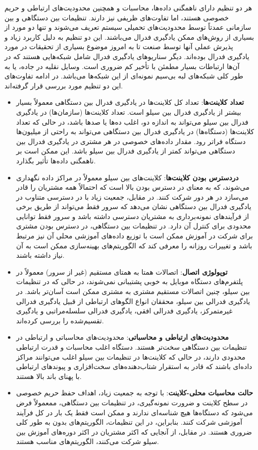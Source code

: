 هر دو تنظیم دارای ناهمگنی داده‌ها، محاسبات و همچنین محدودیت‌های ارتباطی و حریم خصوصی هستند، اما تفاوت‌های ظریفی نیز دارند. تنظیمات بین دستگاهی و بین سازمانی عمدتاً توسط محدودیت‌های تحمیلی سیستم تعریف می‌شوند و تنها دو مورد از بسیاری از روش‌های ممکن یادگیری فدرال می‌باشند. این دو تنظیم به دلیل کاربرد زیاد و پذیرش عملی آنها توسط صنعت تا به امروز موضوع بسیاری از تحقیقات در مورد یادگیری فدرال بوده‌اند. دیگر سناریوهای یادگیری فدرال شامل شبکه‌هایی هستند که در آن‌ها ارتباطات بسیار مطمئن با تأخیر کم ضروری است. وسایل نقلیه در جاده، یا به طور کلی شبکه‌های لبه بی‌سیم نمونه‌ای از این شبکه‌ها می‌باشد. در ادامه تفاوت‌های این دو تنظیم مورد بررسی قرار گرفته‌اند.
\begin{itemize}
	\item 
	\textbf{تعداد کلاینت‌ها}: تعداد کل کلاینت‌ها در یادگیری فدرال بین دستگاهی معمولاً بسیار بیشتر از یادگیری فدرال بین سیلو است. تعداد کلاینت‌ها (سازمان‌ها) در یادگیری فدرال بین سیلو می‌تواند به اندازه دو، اغلب ده‌ها یا صدها باشد، در حالی که تعداد کلاینت‌ها‌ (دستگاه‌ها) در یادگیری فدرال بین دستگاهی می‌تواند به راحتی از میلیون‌ها دستگاه فراتر رود. مقدار داده‌های خصوصی در هر مشتری در یادگیری فدرال بین دستگاهی می‌تواند کمتر از یادگیری فدرال بین سیلو باشد. این ممکن است بر ناهمگنی داده‌ها تأثیر بگذارد.
	\item 
	\textbf{دردسترس بودن کلاینت‌ها}: کلاینت‌های بین سیلو معمولاً در مراکز داده نگهداری می‌شوند، که به معنای در دسترس بودن بالا است که احتمالاً همه مشتریان را قادر می‌سازد در هر دور شرکت کنند. در مقابل، جمعیت زیاد با در دسترسی متناوب در یادگیری فدرال بین دستگاهی نشان می‌دهد که سرور فقط می‌تواند از طریق برخی از فرآیندهای نمونه‌برداری به مشتریان دسترسی داشته باشد و سرور فقط توانایی محدودی برای کنترل آن دارد. در تنظیمات بین دستگاهی، در دسترس بودن مشتری برای شرکت در آموزش ممکن است با توزیع داده‌های آموزشی محلی آن نیز مرتبط باشد و تغییرات روزانه را معرفی کند که الگوریتم‌های بهینه‌سازی ممکن است به آن نیاز داشته باشند.
	\item 
	\textbf{توپولوژی اتصال}: اتصالات همتا به همتای مستقیم (غیر از سرور) معمولاً در پلتفرم‌های دستگاه موبایل به خوبی پشتیبانی نمی‌شوند، در حالی که در تنظیمات بین سیلو، چنین اتصالات مستقیم مشتری به مشتری ممکن است آسان‌تر باشد. در یادگیری فدرالی بین سیلو، محققان انواع الگوهای ارتباطی از قبیل یادگیری فدرالی غیرمتمرکز، یادگیری فدرالی افقی، یادگیری فدرالی سلسله‌مراتبی و یادگیری تقسیم‌شده را بررسی کرده‌اند.
	\item
	\textbf{محدودیت‌های ارتباطی و محاسباتی}: محدودیت‌های محاسباتی و ارتباطی در تنظیمات بین دستگاهی سخت‌تر هستند. دستگاه اغلب محاسبات و قدرت ارتباطی محدودی دارند، در حالی که کلاینت‌ها در تنظیمات بین سیلو اغلب می‌توانند مراکز داده‌ای باشند که قادر به استقرار شتاب‌دهنده‌های سخت‌افزاری و پیوندهای ارتباطی با پهنای باند بالا هستند.
	\item 
	\textbf{حالت محاسبات محلی-کلاینت}: با توجه به جمعیت زیاد، اهداف حفظ حریم خصوصی در سطح کلاینت و ضرورت نمونه‌گیری، در تنظیمات بین دستگاهی، ممعمولاً فرض می‌شود که دستگاه‌ها هیچ شناسه‌ای ندارند و ممکن است فقط یک بار در کل فرآیند آموزشی شرکت کنند. بنابراین، در این تنظیمات، الگوریتم‌های بدون  به طور کلی ضروری هستند. در مقابل، از آنجایی که اکثر مشتریان در اکثر دوره\textbf{}‌های آموزش بین سیلو شرکت می‌کنند، الگوریتم‌های  مناسب هستند.
\end{itemize}

